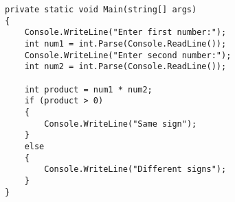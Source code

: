 \documentclass[12pt, twoside]{article}
\begin{document}
\begin{enumerate}[itemsep=3em]
\begin{enumerate}
\ifwithsols
\begin{solution}
\begin{english}
\begin{verbatim}
private static void Main(string[] args)
{
    Console.WriteLine("Enter first number:");
    int num1 = int.Parse(Console.ReadLine());
    Console.WriteLine("Enter second number:");
    int num2 = int.Parse(Console.ReadLine());

    int product = num1 * num2;
    if (product > 0)
    {
        Console.WriteLine("Same sign");
    }
    else
    {
        Console.WriteLine("Different signs");
    }
}
\end{verbatim}
\end{english}
\end{solution}
\clearpage
\fi
\fi




\end{enumerate}
\end{enumerate}
\end{document}
